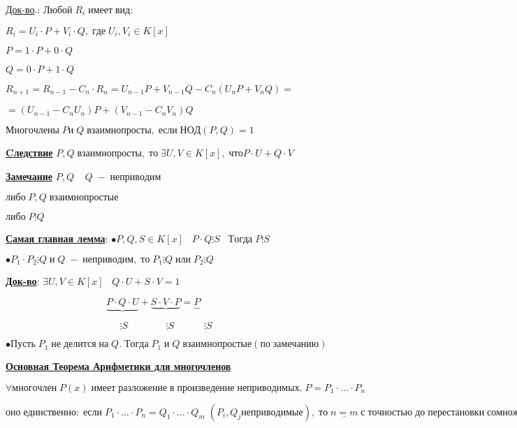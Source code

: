 \documentclass[a4paper,12pt]{article}
\theoremstyle{plain}
\begin{document}
\underline{Док-во}.: $Любой\; R_{i}\; имеет\; вид:$

$R_{i}=U_{i} \cdot P + V_{i} \cdot Q, \;где \; U_{i}, V_{i} \in K[x]$

$P=1 \cdot P + 0 \cdot Q$

$Q=0 \cdot P + 1 \cdot Q$

$R_{n+1}=R_{n-1}-C_{n} \cdot R_{n}=U_{n-1}P+V_{n-1}Q-C_{n}(U_{n}P+V_{n}Q)=$

$=(U_{n-1}-C_{n}U_{n})P+(V_{n-1}-C_{n}V_{n})Q$

\begin{def*}
$Многочлены\; P и\; Q\; взаимнопросты,\; если\; НОД(P , Q)=1$
\end{def*}

\underline{\textbf{Cледствие}} $P, Q\; взаимнопросты,\; то\; \exists U, V \in K[x],\; что P \cdot U + Q \cdot V$

\underline{\textbf{Замечание}} $P, Q \;\;\;\; Q \; -\; неприводим$

$либо\; P, Q \; взаимнопростые$

$либо\; P \vdots Q$

\underline{\textbf{Самая главная лемма}}: $\bullet P, Q, S \in K[x] \;\;\; P \cdot Q \vdots S \;\;\; Тогда\; P \vdots S$

$\bullet P_{1} \cdot P_{2} \vdots Q\; и \; Q\; -\; неприводим,\; то\; P_{1} \vdots Q \; или\; P_{2} \vdots Q$

\underline{\textbf{Док-во}}: $\exists U, V \in K[x] \;\;\; Q \cdot U + S \cdot V = 1$

$\;\;\;\;\;\;\;\;\;\;\;\;\;\;\;\;\;\;\;\;\;\;\;\;\;\;\;\;\;\;\;\;\;\;\;\;\; \underbrace{P\cdot Q\cdot U}+\underbrace{S\cdot V\cdot P}=\underbrace{P}$

$\;\;\;\;\;\;\;\;\;\;\;\;\;\;\;\;\;\;\;\;\;\;\;\;\;\;\;\;\;\;\;\;\;\;\;\;\;\;\;\;\;\; \vdots S \;\;\;\;\;\;\;\;\;\;\;\;\;\;\vdots S \;\;\;\;\;\;\;\;\;\;\;\vdots S \;$

$\bullet Пусть\; P_{1}\; не\; делится\; на\; Q.\; Тогда\; P_{1}\; и\; Q\; взаимнопростые(по\; замечанию)$

\underline{\textbf{Основная Теорема Арифметики для многочленов}}

$\forall многочлен\; P(x)\; имеет\; разложение\; в\; произведение\; неприводимых.\; P=P_{1}\cdot ...\cdot P_{n}$

$оно\; единственно:\; если\; P_{1}\cdot ...\cdot P_{n}=Q_{1}\cdot ...\cdot Q_{m}\; (P_{i}, Q_{j} неприводимые),\; то\; \underline{n=m}\; с\; точностью\; до\; перестановки\; сомножителей. для всех P_{i} эквивалентен Q_{i}$
\end{document}
